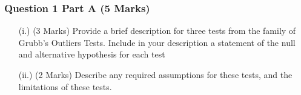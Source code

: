 \documentclass[a4paper,12pt]{article}
\begin{document}
\subsubsection*{Question 1 Part A (5 Marks)}
%
%
\begin{itemize}
	\item[(i.)] (3 Marks) Provide a brief description for three tests from the family of Grubb's Outliers Tests. Include in your description a statement of the null and alternative hypothesis for each test
	\item[(ii.)] (2 Marks) Describe any required assumptions for these tests, and the limitations of these tests.
\end{itemize}
\end{document}
